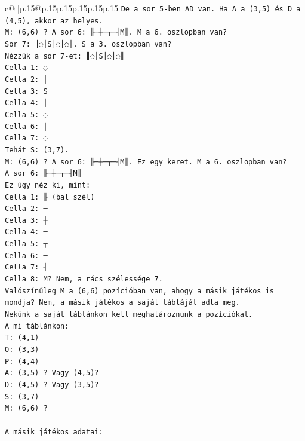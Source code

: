\documentclass{article}
\begin{document}
{\begin{supertabular}{c@{$\;$}|p{.15\linewidth}@{}p{.15\linewidth}p{.15\linewidth}p{.15\linewidth}p{.15\linewidth}p{.15\linewidth}}
{{{\texttt{De a sor 5{-}ben AD van. Ha A a (3,5) és D a (4,5), akkor az helyes.} \\
\texttt{M: (6,6) ? A sor 6: ╟─┼─┬─┤M║. M a 6. oszlopban van?} \\
\texttt{Sor 7: ║◌│S│◌│◌║. S a 3. oszlopban van?} \\
\texttt{Nézzük a sor 7{-}et: ║◌│S│◌│◌║} \\
\texttt{Cella 1: ◌} \\
\texttt{Cella 2: │} \\
\texttt{Cella 3: S} \\
\texttt{Cella 4: │} \\
\texttt{Cella 5: ◌} \\
\texttt{Cella 6: │} \\
\texttt{Cella 7: ◌} \\
\texttt{Tehát S: (3,7).} \\
\texttt{M: (6,6) ? A sor 6: ╟─┼─┬─┤M║. Ez egy keret. M a 6. oszlopban van?} \\
\texttt{A sor 6: ╟─┼─┬─┤M║} \\
\texttt{Ez úgy néz ki, mint:} \\
\texttt{Cella 1: ╟ (bal szél)} \\
\texttt{Cella 2: ─} \\
\texttt{Cella 3: ┼} \\
\texttt{Cella 4: ─} \\
\texttt{Cella 5: ┬} \\
\texttt{Cella 6: ─} \\
\texttt{Cella 7: ┤} \\
\texttt{Cella 8: M? Nem, a rács szélessége 7.} \\
\texttt{Valószínűleg M a (6,6) pozícióban van, ahogy a másik játékos is mondja? Nem, a másik játékos a saját tábláját adta meg.} \\
\texttt{Nekünk a saját táblánkon kell meghatároznunk a pozíciókat.} \\
\texttt{A mi táblánkon:} \\
\texttt{T: (4,1)} \\
\texttt{O: (3,3)} \\
\texttt{P: (4,4)} \\
\texttt{A: (3,5) ? Vagy (4,5)?} \\
\texttt{D: (4,5) ? Vagy (3,5)?} \\
\texttt{S: (3,7)} \\
\texttt{M: (6,6) ?} \\
\\ 
\texttt{A másik játékos adatai:} \\
}}}
\end{supertabular}}
\end{document}
